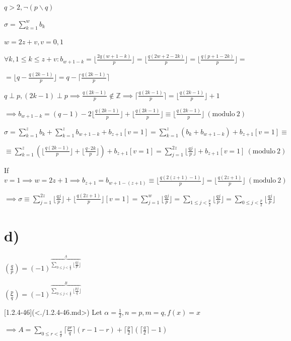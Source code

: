 \documentclass{article}
\begin{document}
\( q > 2, \lnot(p \backslash q) \)

\( \sigma = \sum_{k=1}^w b_k \)

\( w = 2z + v, v = 0,1 \)

\( \forall k, 1 \leq k \leq z + v: b_{w+1-k}= \lfloor{\frac{2q(w+1-k)}{p}}\rfloor = \lfloor{\frac{q(2w+2-2k)}{p}}\rfloor = \lfloor{\frac{q(p+1-2k)}{p}}\rfloor = \)

\( = \lfloor{q - \frac{q(2k-1)}{p}}\rfloor = q - \lceil\frac{q(2k-1)}{p}\rceil \)

\( q \perp p, (2k - 1) \perp p \implies \frac{q(2k-1)}{p} \notin \mathbb{Z} \implies \lceil\frac{q(2k-1)}{p}\rceil = \lfloor\frac{q(2k-1)}{p}\rfloor + 1 \)

\( \implies b_{w+1-k} = (q - 1) - 2\lfloor\frac{q(2k-1)}{p}\rfloor + \lfloor\frac{q(2k-1)}{p}\rfloor \equiv \lfloor\frac{q(2k-1)}{p} \rfloor \ (\mathrm{modulo}\ 2) \)

\( \sigma = \sum_{k=1}^z b_k + \sum_{k=1}^z b_{w+1-k} + b_{z+1}[v=1] = \sum_{k=1}^z(b_k+b_{w+1-k}) + b_{z+1}[v=1] \equiv \)

\( \equiv \sum_{k=1}^z(\lfloor\frac{q(2k-1)}{p}\rfloor + \lfloor\frac{q\cdot 2k}{p}\rfloor) + b_{z+1}[v=1] = \sum_{j=1}^{2z} \lfloor\frac{qj}{p}\rfloor + b_{z+1}[v=1] \ (\mathrm{modulo}\ 2) \)

If \( v = 1 \implies w = 2z + 1 \implies b_{z+1} = b_{w+1-(z+1)} \equiv \lfloor{\frac{q(2(z+1)-1)}{p}}\rfloor = \lfloor{\frac{q(2z+1)}{p}}\rfloor \ (\mathrm{modulo}\ 2) \)

\( \implies \sigma \equiv \sum_{j=1}^{2z} \lfloor\frac{qj}{p}\rfloor + \lfloor{\frac{q(2z+1)}{p}}\rfloor[v=1] = \sum_{j=1}^{w} \lfloor\frac{qj}{p}\rfloor = \sum_{1 \leq j < \frac{p}{2}} \lfloor\frac{qj}{p}\rfloor = \sum_{0 \leq j < \frac{p}{2}} \lfloor\frac{qj}{p}\rfloor \)

\section*{d)}

\( (\frac{q}{p}) = (-1)^{\overbrace{\sum_{0 \leq j < \frac{p}{2}} \lfloor\frac{qj}{p}\rfloor}^A} \)

\( (\frac{p}{q}) = (-1)^{\overbrace{\sum_{0 \leq j < \frac{q}{2}} \lfloor\frac{pj}{q}\rfloor}^B} \)

[1.2.4-46](<./1.2.4-46.md>) Let \( \alpha = \frac{1}{2}, n = p, m = q, f(x) = x \)

\( \implies A = \sum_{0 \leq r < \frac{q}{2}}{\lceil\frac{pr}{q}\rceil} (r - 1 -r) + \lceil{\frac{p}{2}}\rceil(\lceil{\frac{q}{2}}\rceil - 1) \)
\end{document}
